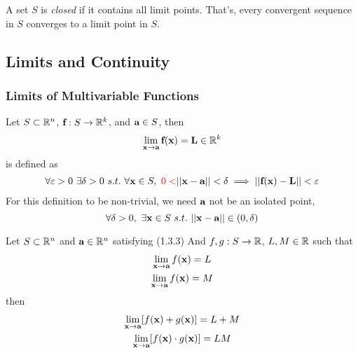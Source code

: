 \documentclass[11pt]{article}
\begin{document}
			\begin{proposition}
				A set $S$ is \emph{closed} if it contains all limit points. That's, every convergent sequence in $S$ converges to a limit point in $S$.
			\end{proposition}
		
		\subsection{Limits and Continuity}
			\subsubsection{Limits of Multivariable Functions}
			\begin{definition}
				Let $S \subset \mathbb{R}^n$, $\textbf{f}: S \to \mathbb{R}^k$, and $\textbf{a} \in S$, then
				\begin{equation}
					\lim_{\textbf{x} \to \textbf{a}} \textbf{f}(\textbf{x}) = \textbf{L} \in \mathbb{R}^k
				\end{equation}
				is defined as
				\begin{gather}
					\forall \varepsilon > 0\ \exists \delta > 0\ s.t.\ \forall \ve{x} \in S,\ \red{0 <} \norm{\ve{x} - \ve{a}} < \delta \implies \norm{\ve{f}(\ve{x}) - \ve{L}} < \varepsilon
				\end{gather}
				For this definition to be non-trivial, we need $\textbf{a}$ not be an isolated point,
				\begin{equation}
					\forall \delta > 0,\ \exists \textbf{x} \in S\ s.t.\ \vert \vert {\textbf{x} - \textbf{a}} \vert \vert \in (0, \delta)
				\end{equation}
			\end{definition}
			
			\begin{theorem}
				Let $S \subset \mathbb{R}^n$ and $\textbf{a} \in \mathbb{R}^n$ satisfying (1.3.3)
				And $f, g: S \to \mathbb{R}$, $L, M \in \mathbb{R}$ such that
				\begin{gather}
					\lim_{\textbf{x} \to \textbf{a}} f(\textbf{x}) = L \\
					\lim_{\textbf{x} \to \textbf{a}} f(\textbf{x}) = M
				\end{gather}
				then 
				\begin{gather}
					\lim_{\textbf{x} \to \textbf{a}} [f(\textbf{x})	+ g(\textbf{x})] = L + M\\
					\lim_{\textbf{x} \to \textbf{a}} [f(\textbf{x}) \cdot g(\textbf{x})] = LM
				\end{gather}
			\end{theorem}
			
\end{document}
